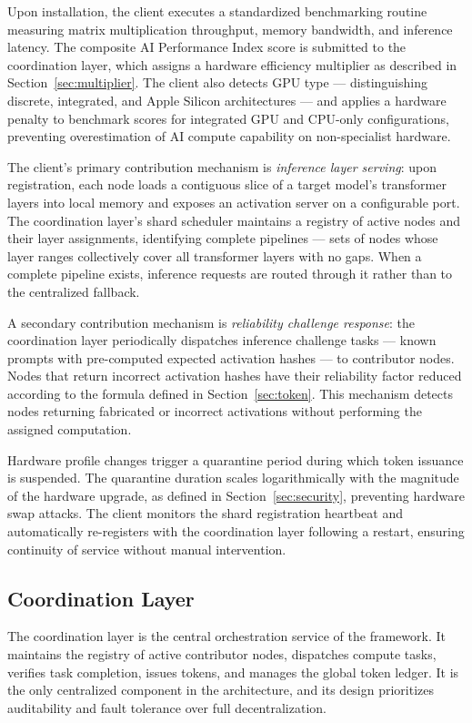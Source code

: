 \documentclass[12pt]{article}
\begin{document}
Upon installation, the client executes a standardized benchmarking routine measuring matrix multiplication throughput, memory bandwidth, and inference latency. The composite AI Performance Index score is submitted to the coordination layer, which assigns a hardware efficiency multiplier as described in Section~\ref{sec:multiplier}. The client also detects GPU type — distinguishing discrete, integrated, and Apple Silicon architectures — and applies a hardware penalty to benchmark scores for integrated GPU and CPU-only configurations, preventing overestimation of AI compute capability on non-specialist hardware.

The client's primary contribution mechanism is \textit{inference layer serving}: upon registration, each node loads a contiguous slice of a target model's transformer layers into local memory and exposes an activation server on a configurable port. The coordination layer's shard scheduler maintains a registry of active nodes and their layer assignments, identifying complete pipelines — sets of nodes whose layer ranges collectively cover all transformer layers with no gaps. When a complete pipeline exists, inference requests are routed through it rather than to the centralized fallback.

A secondary contribution mechanism is \textit{reliability challenge response}: the coordination layer periodically dispatches inference challenge tasks — known prompts with pre-computed expected activation hashes — to contributor nodes. Nodes that return incorrect activation hashes have their reliability factor reduced according to the formula defined in Section~\ref{sec:token}. This mechanism detects nodes returning fabricated or incorrect activations without performing the assigned computation.

Hardware profile changes trigger a quarantine period during which token issuance is suspended. The quarantine duration scales logarithmically with the magnitude of the hardware upgrade, as defined in Section~\ref{sec:security}, preventing hardware swap attacks. The client monitors the shard registration heartbeat and automatically re-registers with the coordination layer following a restart, ensuring continuity of service without manual intervention.

\subsection{Coordination Layer}

The coordination layer is the central orchestration service of the framework. It maintains the registry of active contributor nodes, dispatches compute tasks, verifies task completion, issues tokens, and manages the global token ledger. It is the only centralized component in the architecture, and its design prioritizes auditability and fault tolerance over full decentralization.
\end{document}
